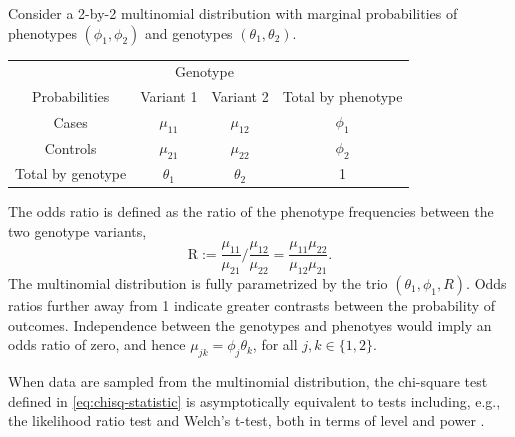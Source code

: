 Consider a 2-by-2 multinomial distribution with marginal probabilities of phenotypes $(\phi_1, \phi_2)$ and genotypes $(\theta_1, \theta_2)$.
\begin{center}
    \begin{tabular}{cccc}
    \hline
    & \multicolumn{2}{c}{Genotype} \\
    \cline{2-3}
    Probabilities & Variant 1 & Variant 2 & Total by phenotype \\
    \hline
    Cases & $\mu_{11}$ & $\mu_{12}$ & $\phi_1$ \\
    Controls & $\mu_{21}$ & $\mu_{22}$ & $\phi_2$ \\
    Total by genotype & $\theta_1$ & $\theta_2$ & 1 \\
    \hline
    \end{tabular}
\end{center}
The odds ratio is defined as the ratio of the phenotype frequencies between the two genotype variants,
\begin{equation} \label{eq:odds-ratio}
    \text{R} := \frac{\mu_{11}}{\mu_{21}}\Big/\frac{\mu_{12}}{\mu_{22}}
    = \frac{\mu_{11}\mu_{22}}{\mu_{12}\mu_{21}}.
\end{equation}
The multinomial distribution is fully parametrized by the trio $(\theta_1, \phi_1, R)$.
Odds ratios further away from 1 indicate greater contrasts between the probability of outcomes.
Independence between the genotypes and phenotyes would imply an odds ratio of zero, and hence $\mu_{jk} = \phi_j\theta_k$, for all $j,k \in\{1,2\}$.

When data are sampled from the multinomial distribution, the chi-square test defined in \eqref{eq:chisq-statistic} is asymptotically equivalent to tests including, e.g., the likelihood ratio test and Welch's t-test, both in terms of level and power \cite{ferguson2017course,gao2019upass}.

